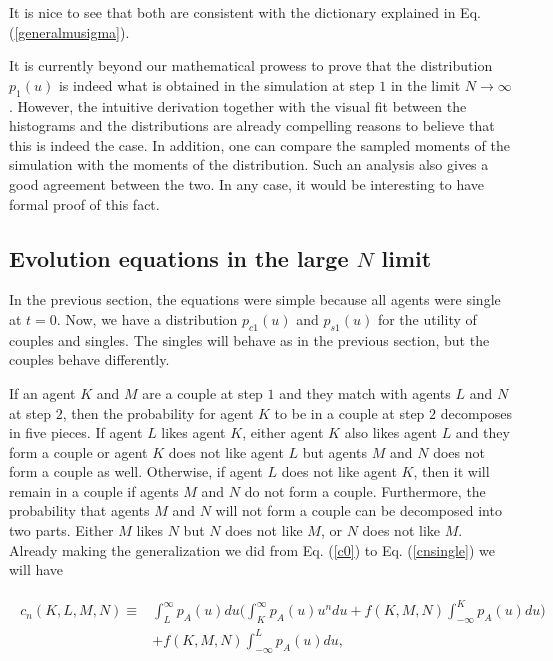 \documentclass[12pt]{article}
\begin{document}
\noindent It is nice to see that both are consistent with the dictionary explained in Eq. (\ref{generalmusigma}).

It is currently beyond our mathematical prowess to prove that the distribution $p_1(u)$ is indeed what is obtained in the simulation at step $1$ in the limit $N\rightarrow\infty$. However, the intuitive derivation together with the visual fit between the histograms and the distributions are already compelling reasons to believe that this is indeed the case. In addition, one can compare the sampled moments of the simulation with the moments of the distribution. Such an analysis also gives a good agreement between the two. In any case, it would be interesting to have formal proof of this fact.


\subsection{Evolution equations in the large \texorpdfstring{$N$}{N} limit}
\label{nextstep}

In the previous section, the equations were simple because all agents were single at $t=0$. Now, we have a distribution $p_{c1}(u)$ and $p_{s1}(u)$ for the utility of couples and singles. The singles will behave as in the previous section, but the couples behave differently.

If an agent $K$ and $M$ are a couple at step $1$ and they match with agents $L$ and $N$ at step $2$, then the probability for agent $K$ to be in a couple at step $2$ decomposes in five pieces. If agent $L$ likes agent $K$, either agent $K$ also likes agent $L$ and they form a couple or agent $K$ does not like agent $L$ but agents $M$ and $N$ does not form a couple as well. Otherwise, if agent $L$ does not like agent $K$, then it will remain in a couple if agents $M$ and $N $ do not form a couple. Furthermore, the probability that agents $M$ and $N$ will not form a couple can be decomposed into two parts. Either $M$ likes $N$ but $N$ does not like $M$, or $N$ does not like $M$. Already making the generalization we did from Eq. (\ref{c0}) to Eq. (\ref{cnsingle}) we will have

\begin{align}
    \begin{split}
    c_n(K,L,M,N)\equiv & \int_{L}^\infty p_A(u)du\Big(\int_{K}^\infty p_A(u)u^ndu+f(K,M,N)\int_{-\infty}^{K}p_A(u)du\Big)\\
    & +f(K,M,N)\int_{-\infty}^{L} p_A(u)du,
    \end{split}
    \label{cncouple}
\end{align}
\end{document}
